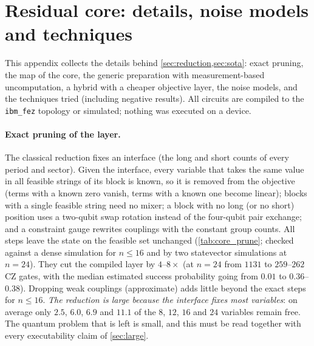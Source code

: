 \section{Residual core: details, noise models and techniques}\label{sec:core}
This appendix collects the details behind \cref{sec:reduction,sec:sota}: exact pruning, the map of the core, the generic preparation with measurement-based uncomputation, a hybrid with a cheaper objective layer, the noise models, and the techniques tried (including negative results). All circuits are compiled to the \texttt{ibm\_fez} topology or simulated; nothing was executed on a device.

\paragraph{Exact pruning of the layer.} The classical reduction fixes an interface (the long and short counts of every period and sector). Given the interface, every variable that takes the same value in all feasible strings of its block is known, so it is removed from the objective (terms with a known zero vanish, terms with a known one become linear); blocks with a single feasible string need no mixer; a block with no long (or no short) position uses a two-qubit swap rotation instead of the four-qubit pair exchange; and a constraint gauge rewrites couplings with the constant group counts. All steps leave the state on the feasible set unchanged (\cref{tab:core_prune}; checked against a dense simulation for $n\le16$ and by two statevector simulations at $n=24$). They cut the compiled layer by $4$--$8\times$ (at $n=24$ from $1131$ to $259$--$262$ CZ gates, with the median estimated success probability going from $0.01$ to $0.36$--$0.38$). Dropping weak couplings (approximate) adds little beyond the exact steps for $n\le16$. \emph{The reduction is large because the interface fixes most variables}: on average only $2.5$, $6.0$, $6.9$ and $11.1$ of the $8$, $12$, $16$ and $24$ variables remain free. The quantum problem that is left is small, and this must be read together with every executability claim of \cref{sec:large}.






